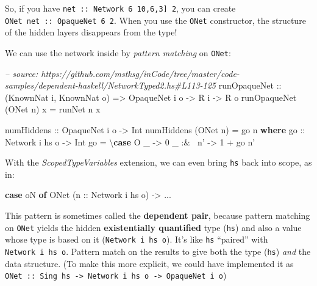 \documentclass[]{article}
\newenvironment{Shaded}{\begin{snugshade}}{\end{snugshade}}
\newcommand{\CommentTok}[1]{\textcolor[rgb]{0.56,0.35,0.01}{\textit{#1}}}
\newcommand{\DataTypeTok}[1]{\textcolor[rgb]{0.13,0.29,0.53}{#1}}
\newcommand{\DecValTok}[1]{\textcolor[rgb]{0.00,0.00,0.81}{#1}}
\newcommand{\FunctionTok}[1]{\textcolor[rgb]{0.00,0.00,0.00}{#1}}
\newcommand{\KeywordTok}[1]{\textcolor[rgb]{0.13,0.29,0.53}{\textbf{#1}}}
\newcommand{\NormalTok}[1]{#1}
\newcommand{\OtherTok}[1]{\textcolor[rgb]{0.56,0.35,0.01}{#1}}
\begin{document}
So, if you have \texttt{net\ ::\ Network\ 6\ \textquotesingle{}{[}10,6,3{]}\ 2},
you can create \texttt{ONet\ net\ ::\ OpaqueNet\ 6\ 2}. When you use the
\texttt{ONet} constructor, the structure of the hidden layers disappears from
the type!

We can use the network inside by \emph{pattern matching} on \texttt{ONet}:

\begin{Shaded}
\begin{Highlighting}[]
\CommentTok{-- source: https://github.com/mstksg/inCode/tree/master/code-samples/dependent-haskell/NetworkTyped2.hs#L113-125}
\OtherTok{runOpaqueNet ::}\NormalTok{ (}\DataTypeTok{KnownNat}\NormalTok{ i, }\DataTypeTok{KnownNat}\NormalTok{ o)}
             \OtherTok{=>} \DataTypeTok{OpaqueNet}\NormalTok{ i o}
             \OtherTok{->} \DataTypeTok{R}\NormalTok{ i}
             \OtherTok{->} \DataTypeTok{R}\NormalTok{ o}
\NormalTok{runOpaqueNet (}\DataTypeTok{ONet}\NormalTok{ n) x }\FunctionTok{=}\NormalTok{ runNet n x}

\OtherTok{numHiddens ::} \DataTypeTok{OpaqueNet}\NormalTok{ i o }\OtherTok{->} \DataTypeTok{Int}
\NormalTok{numHiddens (}\DataTypeTok{ONet}\NormalTok{ n) }\FunctionTok{=}\NormalTok{ go n}
  \KeywordTok{where}
\OtherTok{    go ::} \DataTypeTok{Network}\NormalTok{ i hs o }\OtherTok{->} \DataTypeTok{Int}
\NormalTok{    go }\FunctionTok{=}\NormalTok{ \textbackslash{}}\KeywordTok{case}
        \DataTypeTok{O}\NormalTok{ _      }\OtherTok{->} \DecValTok{0}
\NormalTok{        _ }\FunctionTok{:&~}\NormalTok{ n' }\OtherTok{->} \DecValTok{1} \FunctionTok{+}\NormalTok{ go n'}
\end{Highlighting}
\end{Shaded}

With the \emph{ScopedTypeVariables} extension, we can even bring \texttt{hs}
back into scope, as in:

\begin{Shaded}
\begin{Highlighting}[]
\KeywordTok{case}\NormalTok{ oN }\KeywordTok{of}
  \DataTypeTok{ONet}\NormalTok{ (}\OtherTok{n ::} \DataTypeTok{Network}\NormalTok{ i hs o) }\OtherTok{->} \FunctionTok{...}
\end{Highlighting}
\end{Shaded}

This pattern is sometimes called the \textbf{dependent pair}, because pattern
matching on \texttt{ONet} yields the hidden \textbf{existentially quantified}
type (\texttt{hs}) and also a value whose type is based on it
(\texttt{Network\ i\ hs\ o}). It's like \texttt{hs} ``paired'' with
\texttt{Network\ i\ hs\ o}. Pattern match on the results to give both the type
(\texttt{hs}) \emph{and} the data structure. (To make this more explicit, we
could have implemented it as
\texttt{ONet\ ::\ Sing\ hs\ -\textgreater{}\ Network\ i\ hs\ o\ -\textgreater{}\ OpaqueNet\ i\ o})
\end{document}
